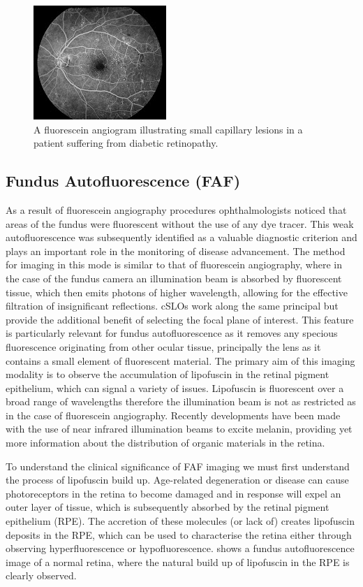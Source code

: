 \begin{figure}[H]
\centering
\includegraphics{figures/fadiabetic}
\caption{A fluorescein angiogram illustrating small capillary lesions in a patient suffering from diabetic retinopathy.}
\label{fig:fluordr}
   \end{figure}

\subsection{Fundus Autofluorescence (FAF)}

As a result of fluorescein angiography procedures ophthalmologists noticed
that areas of the fundus were fluorescent without the use of any dye tracer.
This weak autofluorescence was subsequently identified as a valuable diagnostic
criterion and plays an important role in the monitoring of disease advancement.
The method for imaging in this mode is similar to that of fluorescein angiography,
where in the case of the fundus camera an illumination beam is absorbed by
fluorescent tissue, which then emits photons of higher wavelength, allowing
for the effective filtration of insignificant reflections. cSLOs work along
the same principal but provide the additional benefit of selecting the focal
plane of interest.\cite{schmitz2008fundus} This feature is particularly relevant
for fundus autofluorescence as it removes any specious fluorescence originating
from other ocular tissue, principally the lens as it contains a small element of
fluorescent material. \cite{von1995distribution} The primary aim of this imaging
modality is to observe the accumulation of lipofuscin in the retinal pigment
epithelium, which can signal a variety of issues. Lipofuscin is fluorescent over
a broad range of wavelengths therefore the illumination beam is not as restricted
as in the case of fluorescein angiography. Recently developments have been made
with the use of near infrared illumination beams to excite melanin, providing
yet more information about the distribution of organic materials in the retina.

To understand the clinical significance of FAF imaging we must first understand
the process of lipofuscin build up.\cite{kennedy1995lipofuscin} Age-related
degeneration or disease can cause photoreceptors in the retina to become
damaged and in response will expel an outer layer of tissue, which is
subsequently absorbed by the retinal pigment epithelium (RPE).\cite{spaide2003fundus}
The accretion of these molecules (or lack of) creates lipofuscin deposits
in the RPE, which can be used to characterise the retina either through
observing hyperfluorescence or hypofluorescence.  shows a
fundus autofluorescence image of a normal retina, where the natural
build up of lipofuscin in the RPE is clearly observed.


